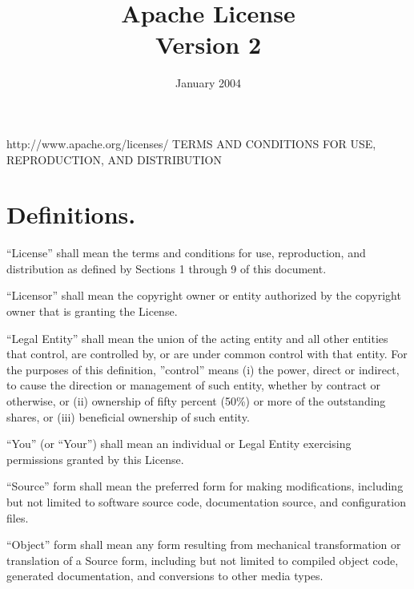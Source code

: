 \documentclass[a4paper, 12pt]{article}
\begin{document}
\title{Apache License \\ Version 2}
\date{January 2004}

\maketitle

http://www.apache.org/licenses/ TERMS AND CONDITIONS FOR USE, REPRODUCTION, AND DISTRIBUTION

\section{Definitions.}

``License'' shall mean the terms and conditions for use, reproduction, and distribution as defined by Sections 1 through 9 of this document.

\vspace{0.3cm}

``Licensor'' shall mean the copyright owner or entity authorized by the copyright owner that is granting the License.

\vspace{0.3cm}

``Legal Entity'' shall mean the union of the acting entity and all other entities that control, are controlled by, or are under common control with that entity. For the purposes of this definition, ''control'' means (i) the power, direct or indirect, to cause the direction or management of such entity, whether by contract or otherwise, or (ii) ownership of fifty percent (50\%) or more of the outstanding shares, or (iii) beneficial ownership of such entity.

\vspace{0.3cm}

``You'' (or ``Your'') shall mean an individual or Legal Entity exercising permissions granted by this License.

\vspace{0.3cm}

``Source'' form shall mean the preferred form for making modifications, including but not limited to software source code, documentation source, and configuration files.

\vspace{0.3cm}

``Object'' form shall mean any form resulting from mechanical transformation or translation of a Source form, including but not limited to compiled object code, generated documentation, and conversions to other media types.
\end{document}
